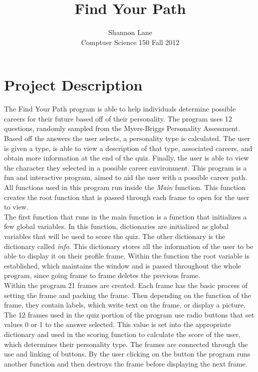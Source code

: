\documentclass[11pt]{article}%
\begin{document}
 
\title{Find Your Path}
\author {Shannon Lane\\Comptuer Science 150 Fall 2012}
 
\maketitle
 
\section*{Project Description}
The Find Your Path program is able to help individuals determine possible careers for their future based off of their personality. The program uses 12 questions, randomly sampled from the Myers-Briggs Personality Assessment. Based off the answers the user selects, a personality type is calculated. The user is given a type, is able to view a description of that type, associated careers, and obtain more information at the end of the quiz. Finally, the user is able to view the character they selected in a possible career environment. This program is a fun and interactive program, aimed to aid the user with a possible career path.\\
\indent All functions used in this program run inside the \textit{Main} function. This function creates the root function that is passed through each frame to open for the user to view.\\
\indent The first function that runs in the main function is a function that initializes a few global variables. In this function, dictionaries are initialized as global variables that will be used to score the quiz. The other dictionary is the dictionary called \textit{info}. This dictionary stores all the information of the user to be able to display it on their profile frame. Within the function the root variable is established, which maintains the window and is passed throughout the whole program, since going frame to frame deletes the previous frame.\\
\indent Within the program 21 frames are created. Each frame has the basic process of setting the frame and packing the frame. Then depending on the function of the frame, they contain labels, which write text on the frame, or display a picture. The 12 frames used in the quiz portion of the program use radio buttons that set values 0 or 1 to the answer selected. This value is set into the appropriate dictionary and used in the scoring function to calculate the score of the user, which determines their personality type. The frames are connected through the use and linking of buttons. By the user clicking on the button the program runs another function and then destroys the frame before displaying the next frame.\\
\end{document}
